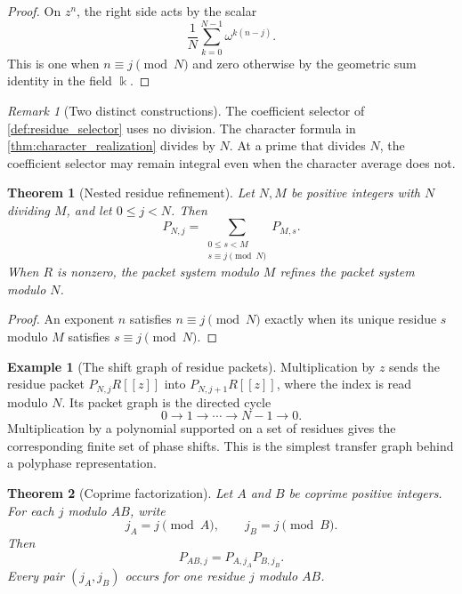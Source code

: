 \documentclass[11pt,a4paper]{article}
\newtheorem{theorem}{Theorem}[section]
\theoremstyle{definition}
\newtheorem{example}[example]{Example}
\theoremstyle{remark}
\newtheorem{remark}[remark]{Remark}
\newcommand{\bbk}{\Bbbk}
\providecommand{\bbk}{\mathbb{k}}
\theoremstyle{definition}\newtheorem{construction}[theorem]{Construction}\newtheorem{certificate}[theorem]{Numerical Certificate}
\theoremstyle{remark}\newtheorem{boundary}[theorem]{Boundary}
\begin{document}
\begin{proof}
On $z^n$, the right side acts by the scalar
\[
\frac1N\sum_{k=0}^{N-1}\omega^{k(n-j)}.
\]
This is one when $n\equiv j\pmod N$ and zero otherwise by the geometric sum identity in the field $\bbk$.
\end{proof}

\begin{remark}[Two distinct constructions]\label{rem:selector_character}
The coefficient selector of \cref{def:residue_selector} uses no division.  The character formula in \cref{thm:character_realization} divides by $N$.  At a prime that divides $N$, the coefficient selector may remain integral even when the character average does not.
\end{remark}

\begin{theorem}[Nested residue refinement]\label{thm:residue_refinement}\label{thm:polyphase-refinement}
Let $N,M$ be positive integers with $N$ dividing $M$, and let $0\leq j<N$.  Then
\[
P_{N,j}
=
\sum_{\substack{0\leq s<M\\s\equiv j\pmod N}}P_{M,s}.
\]
When $R$ is nonzero, the packet system modulo $M$ refines the packet system modulo $N$.
\end{theorem}

\begin{proof}
An exponent $n$ satisfies $n\equiv j\pmod N$ exactly when its unique residue $s$ modulo $M$ satisfies $s\equiv j\pmod N$.
\end{proof}

\begin{example}[The shift graph of residue packets]\label{ex:residue_shift}
Multiplication by $z$ sends the residue packet $P_{N,j}R[[z]]$ into $P_{N,j+1}R[[z]]$, where the index is read modulo $N$.  Its packet graph is the directed cycle
\[
0\longrightarrow1\longrightarrow\cdots\longrightarrow N-1\longrightarrow0.
\]
Multiplication by a polynomial supported on a set of residues gives the corresponding finite set of phase shifts.  This is the simplest transfer graph behind a polyphase representation.
\end{example}

\begin{theorem}[Coprime factorization]\label{thm:crt_factorization}
Let $A$ and $B$ be coprime positive integers.  For each $j$ modulo $AB$, write
\[
j_A=j\pmod A,
\qquad
j_B=j\pmod B.
\]
Then
\[
P_{AB,j}=P_{A,j_A}P_{B,j_B}.
\]
Every pair $(j_A,j_B)$ occurs for one residue $j$ modulo $AB$.
\end{theorem}
\end{document}
